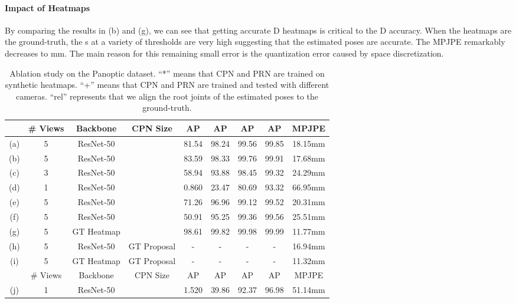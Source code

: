 \documentclass[runningheads]{llncs}
\begin{document}
\paragraph{\textbf{Impact of Heatmaps}}
By comparing the results in (b) and (g), we can see that getting accurate D heatmaps is critical to the D accuracy. When the heatmaps are the ground-truth, the s at a variety of thresholds are very high suggesting that the estimated poses are accurate. The MPJPE remarkably decreases to mm. The main reason for this remaining small error is the quantization error caused by space discretization.

\begin{table*}[]
    \setlength{\tabcolsep}{3pt}
    \centering
    \begin{tabular}{ccccccccc}
    \toprule
    & \# Views  & Backbone & CPN Size & AP & AP & AP & AP & MPJPE \\
    \toprule
    (a) & 5 & ResNet-50 &  & 81.54 & 98.24 & 99.56 & 99.85 & 18.15mm \\
    (b) & 5 & ResNet-50 &  & 83.59 & 98.33 & 99.76 &  99.91 & 17.68mm \\
    (c) & 3 & ResNet-50 &  & 58.94 & 93.88 & 98.45 &  99.32 & 24.29mm \\
    (d) & 1 & ResNet-50 & & 0.860 & 23.47 & 80.69 &  93.32 & 66.95mm \\
    \midrule
    (e) & 5 & ResNet-50 &  & 71.26 & 96.96 & 99.12 & 99.52 & 20.31mm \\
    (f) & 5 & ResNet-50 &  & 50.91 & 95.25 & 99.36 & 99.56 & 25.51mm \\
    \midrule
    (g) & 5 & GT Heatmap &  & 98.61 & 99.82 & 99.98 & 99.99 & 11.77mm \\
    (h) & 5 & ResNet-50 & GT Proposal & - & - & - & - & 16.94mm \\
    (i) & 5 & GT Heatmap & GT Proposal & - & - & - & - & 11.32mm \\
    \bottomrule
    \toprule
    & \# Views  & Backbone & CPN Size & AP & AP & AP  & AP & MPJPE\\
    \midrule
    (j) & 1 & ResNet-50 &   & 1.520 & 39.86 & 92.37 &  96.98 & 51.14mm\\
    \bottomrule
    \end{tabular}
    \caption{Ablation study on the Panoptic dataset. ``*'' means that CPN and PRN are trained on synthetic heatmaps. ``+'' means that CPN and PRN are trained and tested with different cameras. ``rel'' represents that we align the root joints of the estimated poses to the ground-truth.}
    \label{tab:ablative_panoptic}
\end{table*}
\end{document}
